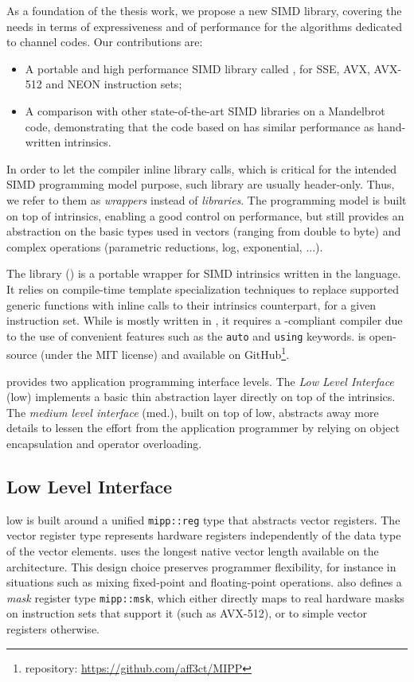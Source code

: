 As a foundation of the thesis work, we propose a new \Cxx SIMD library, covering
the needs in terms of expressiveness and of performance for the algorithms
dedicated to channel codes. Our contributions are:
\begin{itemize}
  \item A portable and high performance  \Cxx SIMD library called \MIPP, for
    SSE, AVX, AVX-512 and NEON instruction sets;
  \item A comparison with other state-of-the-art SIMD libraries on a Mandelbrot
    code, demonstrating that the code based on \MIPP has similar performance as
    hand-written intrinsics.
\end{itemize}
In order to let the compiler inline library calls, which is critical for the
intended SIMD programming model purpose, such library are usually header-only.
Thus, we refer to them as \textit{wrappers} instead of \textit{libraries}.
The \MIPP programming model is built on top of intrinsics, enabling a good
control on performance, but still provides an abstraction on the basic types
used in vectors (ranging from double to byte) and complex operations (parametric
reductions, log, exponential, ...).

The \longMIPP library (\MIPP) is a portable wrapper for SIMD intrinsics written
in the \Cxx language. It relies on \Cxx compile-time template specialization
techniques to replace supported generic functions with inline calls to their
intrinsics counterpart, for a given instruction set. While \MIPP is mostly
written in , it requires a -compliant compiler due to the use of
convenient features such as the \verb|auto| and \verb|using| keywords. \MIPP is
open-source (under the MIT license) and available on GitHub\footnote{\MIPP
repository: \url{https://github.com/aff3ct/MIPP}}.

\MIPP provides two application programming interface levels. The
\emph{Low Level Interface} (low) implements a basic thin abstraction layer
directly on top of the intrinsics. The \emph{medium level interface} (med.),
built on top of \MIPP low, abstracts away more details to lessen the effort from
the application programmer by relying on object encapsulation and operator
overloading.

\subsection{Low Level Interface}

\MIPP low is built around a unified \verb|mipp::reg| type that abstracts vector
registers. The vector register type represents hardware registers independently
of the data type of the vector elements. \MIPP uses the longest native vector
length available on the architecture. This design choice preserves programmer
flexibility, for instance in situations such as mixing fixed-point and
floating-point operations. \MIPP also defines a \emph{mask} register type
\verb|mipp::msk|, which either directly maps to real hardware masks on
instruction sets that support it (such as AVX-512), or to simple vector
registers otherwise.

